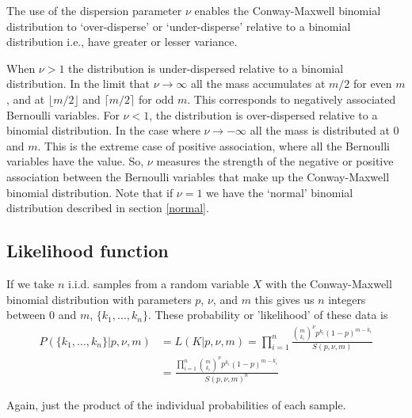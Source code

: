 \documentclass[a4paper,12pt]{article}
\theoremstyle{definition}
\begin{document}
The use of the dispersion parameter $\nu$ enables the Conway-Maxwell binomial distribution to `over-disperse' or `under-disperse' relative to a binomial distribution i.e., have greater or lesser variance.

When $\nu > 1$ the distribution is under-dispersed relative to a binomial distribution. In the limit that $\nu \rightarrow \infty$ all the mass accumulates at $m/2$ for even $m$, and at $\lfloor m/2 \rfloor$ and $\lceil m/2 \rceil$ for odd $m$. This corresponds to negatively associated Bernoulli variables. For $\nu < 1$, the distribution is over-dispersed relative to a binomial distribution. In the case where $\nu \rightarrow -\infty$ all the mass is distributed at $0$ and $m$. This is the extreme case of positive association, where all the Bernoulli variables have the value. So, $\nu$ measures the strength of the negative or positive association between the Bernoulli variables that make up the Conway-Maxwell binomial distribution. Note that if $\nu =1$ we have the `normal' binomial distribution described in section \ref{normal}.

\subsection{Likelihood function}
If we take $n$ i.i.d. samples from a random variable $X$ with the Conway-Maxwell binomial distribution with parameters $p$, $\nu$, and $m$ this gives us $n$ integers between $0$ and $m$, $\lbrace k_1, \dots , k_n \rbrace$. These probability or 'likelihood' of these data is
\begin{align}
  P(\lbrace k_1, \dots, k_n \rbrace | p, \nu, m) &= L(K | p, \nu, m) = \prod_{i=1}^{n} \frac{\binom{m}{k_i}^{\nu} p^{k_i} (1-p)^{m-k_i}}{S(p, \nu, m)} \\ 
  & = \frac{\prod_{i=1}^{n} \binom{m}{k_i}^{\nu} p^{k_i} (1-p)^{m-k_i}}{S(p, \nu, m)^n}
\end{align}

Again, just the product of the individual probabilities of each sample.
\end{document}
